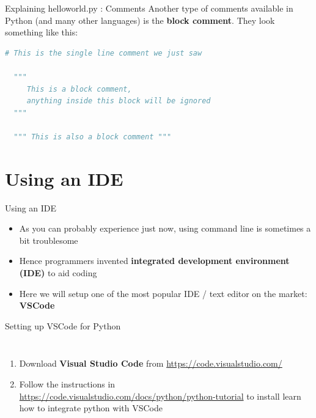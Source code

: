 \documentclass[10pt,xcolor={table,dvipsnames},t]{beamer}
\begin{document}
\begin{frame}[fragile]{Explaining helloworld.py : Comments}
  Another type of comments available in Python (and many other languages) is the \textbf{block comment}. They look something like this:
\begin{lstlisting}[language=python]
  # This is the single line comment we just saw

  """ 
     This is a block comment,
     anything inside this block will be ignored
  """

  """ This is also a block comment """
\end{lstlisting}
\end{frame}

\section{Using an IDE}
\begin{frame}{Using an IDE}
  \begin{itemize}
    \item As you can probably experience just now, using command line is sometimes a bit troublesome
    \item Hence programmers invented \textbf{integrated development environment (IDE)} to aid coding
    \item Here we will setup one of the most popular IDE / text editor on the market: \textbf{VSCode}
  \end{itemize}
\end{frame}

\begin{frame}{Setting up VSCode for Python}
  \begin{columns}
    \begin{enumerate}[Step 1:]
      \item Download \textbf{Visual Studio Code} from \href{https://code.visualstudio.com/}{https://code.visualstudio.com/}
      \item Follow the instructions in \href{https://code.visualstudio.com/docs/python/python-tutorial}{https://code.visualstudio.com/docs/python/python-tutorial} to install learn how to integrate python with VSCode
    \end{enumerate}
  \end{columns}
  
\end{frame}
\end{document}
